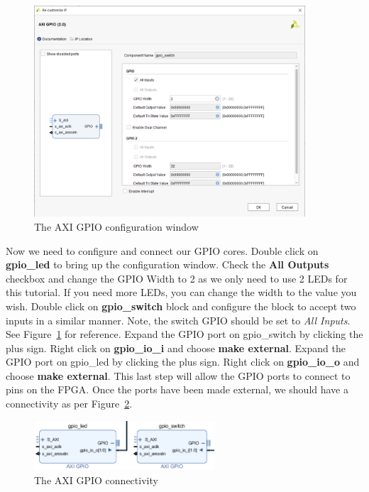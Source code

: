 \documentclass[11pt]{article}
\begin{document}
\begin{figure}[!h]
    \centering
    \includegraphics[width=0.9\textwidth]{images/gpio_config.png}
    \caption{The AXI GPIO configuration window}
    \label{fig:gpio_config}
\end{figure}

Now we need to configure and connect our GPIO cores. Double click on \textbf{gpio\_led} to bring up the configuration window. Check the \textbf{All Outputs} checkbox and change the GPIO Width to 2 as we only need to use 2 LEDs for this tutorial. If you need more LEDs, you can change the width to the value you wish. Double click on \textbf{gpio\_switch} block and configure the block to accept two inputs in a similar manner. Note, the switch GPIO should be set to \textit{All Inputs}. See Figure~\ref{fig:gpio_config} for reference. Expand the GPIO port on gpio\_switch by clicking the plus sign. Right click on \textbf{gpio\_io\_i} and choose \textbf{make external}. Expand the GPIO port on gpio\_led by clicking the plus sign. Right click on \textbf{gpio\_io\_o} and choose \textbf{make external}. This last step will allow the GPIO ports to connect to pins on the FPGA. Once the ports have been made external, we should have a connectivity as per Figure~\ref{fig:gpio_connect}.

\begin{figure}[h]
    \centering
    \includegraphics[width=0.6\textwidth]{images/gpio_connect.png}
    \caption{The AXI GPIO connectivity}
    \label{fig:gpio_connect}
\end{figure}
\end{document}
